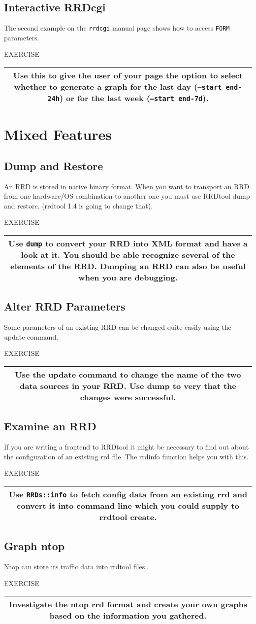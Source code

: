 \documentclass[a4paper,12pt]{article}
\newenvironment{work}{\textsf{\tiny EXERCISE}\nopagebreak\\[0.3ex]\begin{tabular}{|c|}
 \hline
 \begin{minipage}{0.965\linewidth}%
 \setlength{\parskip}{1.6ex plus 0.6ex minus 0.4ex}%
 \rule{0pt}{2.8ex}\ignorespaces}
{\rule[-1.8ex]{0pt}{0pt}\end{minipage}\\
 \hline
 \end{tabular}}
\newcommand{\ex}[1]{\subsection{#1}}
\newcommand{\cmd}[1]{\texttt{\mbox{#1}}}
\begin{document}
\ex{Interactive RRDcgi}
The second example on the \cmd{rrdcgi} manual page shows how to access
\cmd{FORM} parameters.

\begin{work}
Use this to give the user of your page the
option to select whether to generate a graph for the last day (\cmd{--start
end-24h}) or for the last week (\cmd{--start end-7d}).
\end{work}
\newpage
\section{Mixed Features}
\ex{Dump and Restore} An RRD is stored in native binary format. When
you want to transport an RRD from one hardware/OS combination to
another one you must use RRDtool dump and restore. (rrdtool 1.4 is going to change that).

\begin{work}
Use \cmd{dump} to convert your RRD into XML format and have a look at
it. You should be able recognize several of the elements of the
RRD. Dumping an RRD can also be useful when you are debugging.
\end{work}

\ex{Alter RRD Parameters}
Some parameters of an existing RRD can be changed quite easily using
the update command.

\begin{work}
Use the update command to change the name of the two data sources in
your RRD. Use dump to very that the changes were successful.
\end{work}


\ex{Examine an RRD}

If you are writing a frontend to RRDtool it might be necessary to
find out about the configuration of an existing rrd file. The rrdinfo
function helps you with this.

\begin{work}
  Use \texttt{RRDs::info} to fetch config data from an existing rrd
  and convert it into command line which you could supply to rrdtool
  create.
\end{work}

\ex{Graph ntop}

Ntop can store its traffic data into rrdtool files..

\begin{work}
  Investigate the ntop rrd format and create your own graphs based on the information you gathered.
\end{work}
\end{document}

